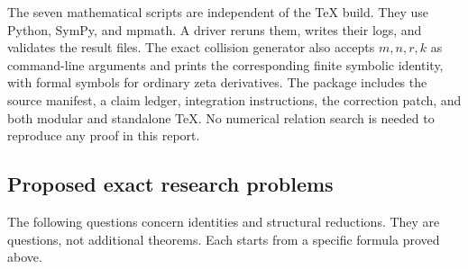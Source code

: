 The seven mathematical scripts are independent of the TeX build. They
use Python, SymPy, and mpmath. A driver reruns them, writes their logs,
and validates the result files. The exact collision generator also
accepts $m,n,r,k$ as command-line arguments and prints the corresponding
finite symbolic identity, with formal symbols for ordinary zeta
derivatives. The package includes the source manifest, a claim ledger,
integration instructions, the correction patch, and both modular and
standalone TeX. No numerical relation search is needed to reproduce any
proof in this report.

\subsection{Proposed exact research problems}
\label{xid:sec:further-research}

The following questions concern identities and structural reductions.
They are questions, not additional theorems. Each starts from a specific
formula proved above.

